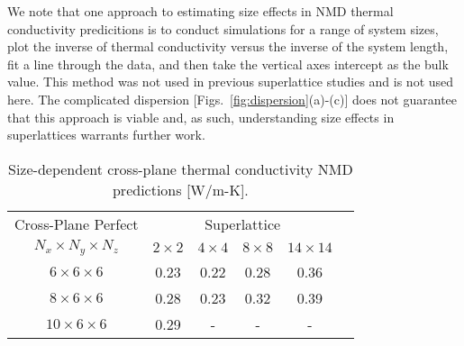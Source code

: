 \documentclass[aps,prb,preprint,preprintnumbers,amsmath,amssymb,floatfix,superscriptaddress]{revtex4}
\begin{document}
We note that one approach to estimating size effects in NMD thermal conductivity predicitions is to conduct simulations for a range of system sizes, plot the inverse of thermal conductivity versus the inverse of the system length, fit a line through the data, and then take the vertical axes intercept as the bulk value.\cite{PhysRevB.81.214305}  %
This method was not used in previous superlattice studies \cite{doi:10.1021/nl202186y,savic:073113,Luckyanova16112012} and is not used here. The complicated dispersion [Figs.~\ref{fig:dispersion}(a)-(c)] does not guarantee that this approach is viable and, as such, understanding size effects in superlattices warrants further work.

\begin{table*}[h!]
\begin{center}
\begin{tabular*}{\textwidth}{c@{\extracolsep{\fill}}ccccc}
\hline\hline\noalign{\smallskip}
Cross-Plane Perfect& \multicolumn{4}{c}{Superlattice} \\
\cline{2-5}\noalign{\smallskip}
$N_x\times N_y \times N_z$ & $2\times2$ & $4\times4$ & $8\times8$ & $14\times14$  \\
\noalign{\smallskip}\hline\noalign{\smallskip}
$6\times6\times6$ & 0.23  & 0.22  &  0.28  &  0.36 \\
$8\times6\times6$ & 0.28  & 0.23  &  0.32  &  0.39 \\
$10\times6\times6$ & 0.29  &  - &  -  &  - \\
\hline\hline
\end{tabular*}
\end{center}
\renewcommand{\table}{Table.}
\caption{Size-dependent cross-plane thermal conductivity NMD predictions [W/m-K].}
\label{TB:K_CP_NMDsize}
\end{table*}
\end{document}
